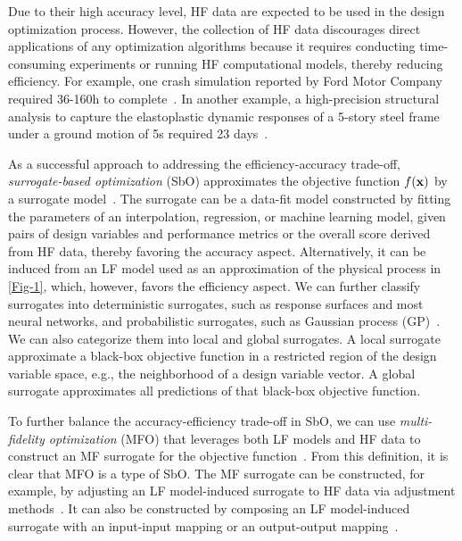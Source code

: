 \documentclass[journal ]{new-aiaa}
\begin{document}
Due to their high accuracy level, HF data are expected to be used in the design optimization process.
However, the collection of HF data discourages direct applications of any optimization algorithms because it requires conducting time-consuming experiments or running HF computational models, thereby reducing efficiency.
For example, one crash simulation reported by Ford Motor Company required 36-160h to complete~\citep{Wang2006}.
In another example, a high-precision structural analysis to capture the elastoplastic dynamic responses of a 5-story steel frame under a ground motion of 5s required 23 days~\citep{Ohsaki2009}.

As a successful approach to addressing the efficiency-accuracy trade-off, \textit{surrogate-based optimization} (SbO) approximates the objective function $f(\bf x)$ by a surrogate model~\citep{Queipo2005,Wang2006,Forrester2008,Simpson2008,Forrester2009}.
The surrogate can be a data-fit model constructed by fitting the parameters of an interpolation, regression, or machine learning model, given pairs of design variables and performance metrics or the overall score derived from HF data, thereby favoring the accuracy aspect.
Alternatively, it can be induced from an LF model used as an approximation of the physical process in \cref{Fig-1}, which, however, favors the efficiency aspect.
We can further classify surrogates into deterministic surrogates, such as response surfaces and most neural networks, and probabilistic surrogates, such as Gaussian process (GP)~\citep{Rasmussen2006}.
We can also categorize them into local and global surrogates.
A local surrogate approximate a black-box objective function in a restricted region of the design variable space, e.g., the neighborhood of a design variable vector.
A global surrogate approximates all predictions of that black-box objective function.

To further balance the accuracy-efficiency trade-off in SbO, we can use \textit{multi-fidelity optimization} (MFO) that leverages both LF models and HF data to construct an MF surrogate for the objective function~\citep{Alexandrov1998,Huang2006smo,Forrester2007,Viana2014}.
From this definition, it is clear that MFO is a type of SbO.
The MF surrogate can be constructed, for example, by adjusting an LF model-induced surrogate to HF data via adjustment methods~\citep{Kennedy2000,Han2012,Gratiet2014}.
It can also be constructed by composing an LF model-induced surrogate with an input-input mapping or an output-output mapping~\citep{Bandler1994,Bandler2004,Perdikaris2017}.
\end{document}
